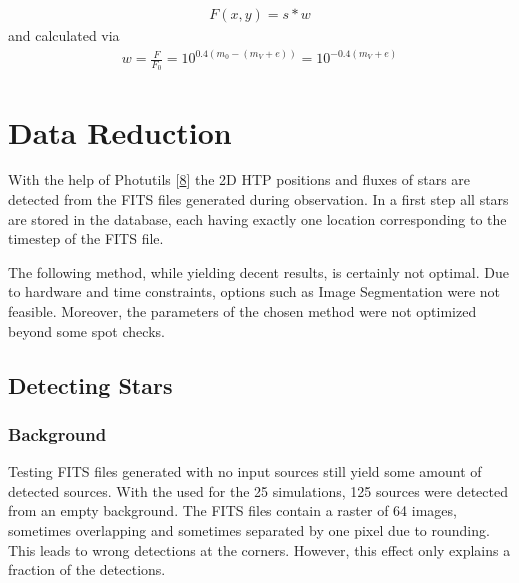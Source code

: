 \documentclass[letterpaper,10pt,english]{sphinxmanual}
\begin{document}
\begin{equation*}
\begin{split}F\left (x,y \right ) = s * w\end{split}
\end{equation*}
\sphinxAtStartPar
and calculated via
\begin{equation*}
\begin{split}w = \frac{F}{F_0} = 10^{0.4\left ( m_0-(m_V+e) \right )}=10^{-0.4 (m_V+e)}\end{split}
\end{equation*}

\chapter{Data Reduction}
\label{\detokenize{NBodySimulation/DataReduction:data-reduction}}\label{\detokenize{NBodySimulation/DataReduction::doc}}
\sphinxAtStartPar
With the help of Photutils {[}\hyperlink{cite.NBodySimulation/Appendix:id54}{8}{]} the 2D HTP positions and fluxes of stars are detected from the FITS files generated during observation.
In a first step all stars are stored in the database, each having exactly one location corresponding to the timestep of the FITS file.

\sphinxAtStartPar
The following method, while yielding decent results, is certainly not optimal.
Due to hardware and time constraints, options such as Image Segmentation were not feasible. Moreover, the parameters of the chosen method were not optimized beyond some spot checks.


\section{Detecting Stars}
\label{\detokenize{NBodySimulation/DataReduction:detecting-stars}}

\subsection{Background}
\label{\detokenize{NBodySimulation/DataReduction:background}}
\sphinxAtStartPar
Testing FITS files generated with no input sources still yield some amount of detected sources.
With the {\hyperref[\detokenize{NBodySimulation/Experiments:parameters-label}]{}} used for the 25 simulations, 125 sources were detected from an empty background.
The FITS files contain a raster of 64 images, sometimes overlapping and sometimes separated by one pixel due to rounding.
This leads to wrong detections at the corners. However, this effect only explains a fraction of the detections.
\end{document}

